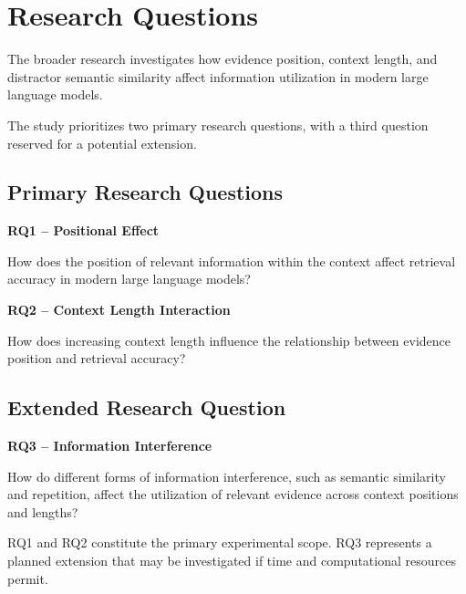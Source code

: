 
\section{Research Questions}
\label{sec:research-questions}

The broader research investigates how evidence position, context length, and
distractor semantic similarity affect information utilization in modern large
language models.

The study prioritizes two primary research questions, with a third question
reserved for a potential extension.

\subsection{Primary Research Questions}

\textbf{RQ1 -- Positional Effect}

How does the position of relevant information within the context affect
retrieval accuracy in modern large language models?


\noindent\textbf{RQ2 -- Context Length Interaction}

How does increasing context length influence the relationship between evidence
position and retrieval accuracy?

\subsection{Extended Research Question}

\textbf{RQ3 -- Information Interference}

How do different forms of information interference,
such as semantic similarity and repetition, affect 
the utilization of relevant evidence across context
positions and lengths?

RQ1 and RQ2 constitute the primary experimental scope. RQ3 represents a planned
extension that may be investigated if time and computational resources permit.
